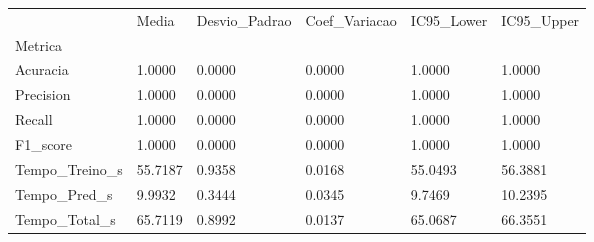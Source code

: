 \begin{tabular}{llllll}
\toprule
 & Media & Desvio_Padrao & Coef_Variacao & IC95_Lower & IC95_Upper \\
Metrica &  &  &  &  &  \\
\midrule
Acuracia & 1.0000 & 0.0000 & 0.0000 & 1.0000 & 1.0000 \\
Precision & 1.0000 & 0.0000 & 0.0000 & 1.0000 & 1.0000 \\
Recall & 1.0000 & 0.0000 & 0.0000 & 1.0000 & 1.0000 \\
F1_score & 1.0000 & 0.0000 & 0.0000 & 1.0000 & 1.0000 \\
Tempo_Treino_s & 55.7187 & 0.9358 & 0.0168 & 55.0493 & 56.3881 \\
Tempo_Pred_s & 9.9932 & 0.3444 & 0.0345 & 9.7469 & 10.2395 \\
Tempo_Total_s & 65.7119 & 0.8992 & 0.0137 & 65.0687 & 66.3551 \\
\bottomrule
\end{tabular}
